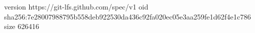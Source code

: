 version https://git-lfs.github.com/spec/v1
oid sha256:7e28007988795b558deb922530da436c92fa020ec05e3aa259fe1d62f4e1c786
size 626416
